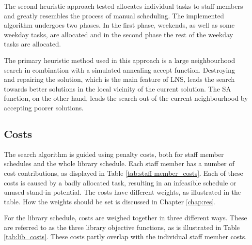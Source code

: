 The second heuristic approach tested allocates individual tasks to staff members and greatly resembles the process of manual scheduling. The implemented algorithm undergoes two phases. In the first phase, weekends, as well as some weekday tasks, are allocated and in the second phase the rest of the weekday tasks are allocated. 

The primary heuristic method used in this approach is a large neighbourhood search in combination with a simulated annealing accept function. Destroying and repairing the solution, which is the main feature of LNS, leads the search towards better solutions in the local vicinity of the current solution. The SA function, on the other hand, leads the search out of the current neighbourhood by accepting poorer solutions.

\subsection{Costs} \label{subsection:tasks_cost}
The search algorithm is guided using penalty costs, both for staff member schedules and the whole library schedule. Each staff member has a number of cost contributions, as displayed in Table \ref{tab:staff member_costs}. Each of these costs is caused by a badly allocated task, resulting in an infeasible schedule or unused stand-in potential. The costs have different weights, as illustrated in the table. How the weights should be set is discussed in Chapter \ref{chap:res}. 

For the library schedule, costs are weighed together in three different ways. These are referred to as the three library objective functions, as is illustrated in Table \ref{tab:lib_costs}. These costs partly overlap with the individual staff member costs.

